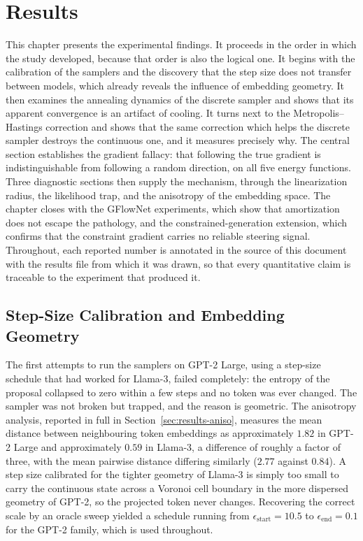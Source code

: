 \chapter{Results}
\label{ch:results}

This chapter presents the experimental findings. It proceeds in the order in which the study developed, because that order is also the logical one. It begins with the calibration of the samplers and the discovery that the step size does not transfer between models, which already reveals the influence of embedding geometry. It then examines the annealing dynamics of the discrete sampler and shows that its apparent convergence is an artifact of cooling. It turns next to the Metropolis--Hastings correction and shows that the same correction which helps the discrete sampler destroys the continuous one, and it measures precisely why. The central section establishes the gradient fallacy: that following the true gradient is indistinguishable from following a random direction, on all five energy functions. Three diagnostic sections then supply the mechanism, through the linearization radius, the likelihood trap, and the anisotropy of the embedding space. The chapter closes with the GFlowNet experiments, which show that amortization does not escape the pathology, and the constrained-generation extension, which confirms that the constraint gradient carries no reliable steering signal. Throughout, each reported number is annotated in the source of this document with the results file from which it was drawn, so that every quantitative claim is traceable to the experiment that produced it.

\section{Step-Size Calibration and Embedding Geometry}
\label{sec:results-stepsize}

The first attempts to run the samplers on GPT-2 Large, using a step-size schedule that had worked for Llama-3, failed completely: the entropy of the proposal collapsed to zero within a few steps and no token was ever changed. The sampler was not broken but trapped, and the reason is geometric. The anisotropy analysis, reported in full in Section~\ref{sec:results-aniso}, measures the mean distance between neighbouring token embeddings as approximately $1.82$ in GPT-2 Large and approximately $0.59$ in Llama-3, a difference of roughly a factor of three, with the mean pairwise distance differing similarly ($2.77$ against $0.84$).
A step size calibrated for the tighter geometry of Llama-3 is simply too small to carry the continuous state across a Voronoi cell boundary in the more dispersed geometry of GPT-2, so the projected token never changes. Recovering the correct scale by an oracle sweep yielded a schedule running from $\epsilon_{\text{start}} = 10.5$ to $\epsilon_{\text{end}} = 0.1$ for the GPT-2 family, which is used throughout.

